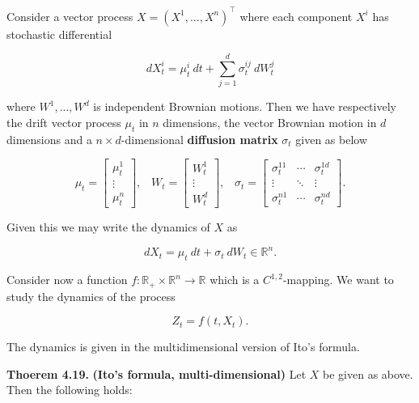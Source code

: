 \documentclass[
]{article}
\begin{document}
Consider a vector process \(X=(X^1,...,X^n)^\top\) where each component
\(X^i\) has stochastic differential

\[
d X_t^i=\mu_t^i\ dt+\sum_{j=1}^d\sigma^{ij}_t\ dW_t^j
\]

where \(W^1,...,W^d\) is independent Brownian motions. Then we have
respectively the drift vector process \(\mu_t\) in \(n\) dimensions, the
vector Brownian motion in \(d\) dimensions and a
\(n\times d\)-dimensional \textbf{diffusion matrix} \(\sigma_t\) given
as below

\[
\mu_t=\begin{bmatrix}\mu^1_t\\ \vdots\\ \mu^n_t\end{bmatrix},\hspace{10pt}W_t=\begin{bmatrix}W^1_t\\ \vdots\\ W^d_t\end{bmatrix},\hspace{10pt}\sigma_t=\begin{bmatrix}\sigma^{11}_t & \cdots & \sigma^{1d}_t \\ \vdots & \ddots & \vdots\\ \sigma^{n1}_t &\cdots& \sigma^{nd}_t\end{bmatrix}.
\]

Given this we may write the dynamics of \(X\) as

\[
d X_t=\mu_t\ dt+\sigma_t\ dW_t\in\mathbb{R}^n.
\]

Consider now a function
\(f:\mathbb{R}_+\times \mathbb{R}^n\to\mathbb{R}\) which is a
\(C^{1,2}\)-mapping. We want to study the dynamics of the process

\[
Z_t=f(t,X_t).
\]

The dynamics is given in the multidimensional version of Ito's formula.

\textbf{Thoerem 4.19.} \textbf{(Ito's formula, multi-dimensional)} Let
\(X\) be given as above. Then the following holds:
\end{document}
